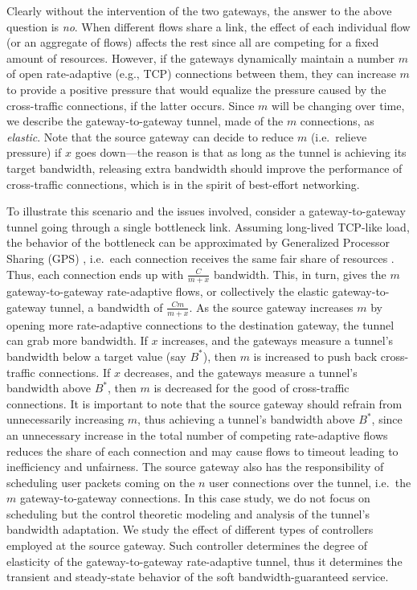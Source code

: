 \documentclass{article}
\begin{document}
Clearly without the intervention of the two gateways, the answer to the above
  question is {\em no}. When different flows share a link, the effect
  of each individual flow (or an aggregate of flows) affects the rest
  since all are competing for a fixed amount of resources.  However,
  if the gateways dynamically maintain a number $m$ of open rate-adaptive (e.g., TCP)
  connections between them, they can increase $m$ to provide a positive pressure that
  would equalize the pressure caused by the cross-traffic connections,
  if the latter occurs.  Since $m$ will be changing over time, we
  describe the gateway-to-gateway tunnel, made of the $m$ connections, as {\em elastic}.  Note that the
  source gateway can decide to reduce $m$ (i.e.\ relieve pressure) if $x$
  goes down---the reason is that as long as the tunnel is achieving
  its target bandwidth, releasing extra bandwidth should improve the
  performance of cross-traffic connections, which is in the spirit of
  best-effort networking.


To illustrate this scenario and  the issues involved,
  consider a gateway-to-gateway tunnel going through a single bottleneck
  link.  Assuming long-lived TCP-like load, the behavior of the bottleneck can be
  approximated by Generalized Processor Sharing (GPS) \cite{GPS:1994}, 
  i.e.\ each connection receives the same fair share of resources \cite{Chiu:1989}.
  Thus, each connection ends up with
  $\frac{C}{m+x}$ bandwidth.  This, in turn, gives the $m$ gateway-to-gateway rate-adaptive
  flows, or collectively the elastic gateway-to-gateway tunnel, a bandwidth of
  $\frac{Cm}{m+x}$.  As the source gateway increases $m$ by opening more
  rate-adaptive connections to the destination gateway, the tunnel can grab more
  bandwidth.  If $x$ increases, and the gateways measure a tunnel's
  bandwidth below a target value (say $B^*$), then $m$ is increased to
  push back cross-traffic connections.  If $x$ decreases, and the gateways
  measure a tunnel's bandwidth above $B^*$, then $m$ is decreased for
  the good of cross-traffic connections.  It is important to note that
  the source gateway should refrain from unnecessarily increasing $m$,
  thus achieving a tunnel's bandwidth above $B^*$, since an
  unnecessary increase in the total number of competing rate-adaptive flows
  reduces the share of each connection and may cause flows to
  timeout leading to inefficiency and unfairness.  
  The source gateway also has the responsibility
  of scheduling user packets coming on the $n$ user connections over
  the tunnel, i.e.\ the $m$ gateway-to-gateway connections.
  In this case study, we do not focus on scheduling but the control theoretic 
  modeling and analysis of the tunnel's bandwidth adaptation.
 We study the effect of different types of controllers employed at the source gateway.
 Such controller determines the degree of
elasticity of the gateway-to-gateway rate-adaptive tunnel,
thus it determines
the transient and steady-state behavior of
the soft bandwidth-guaranteed service. \\
\end{document}
